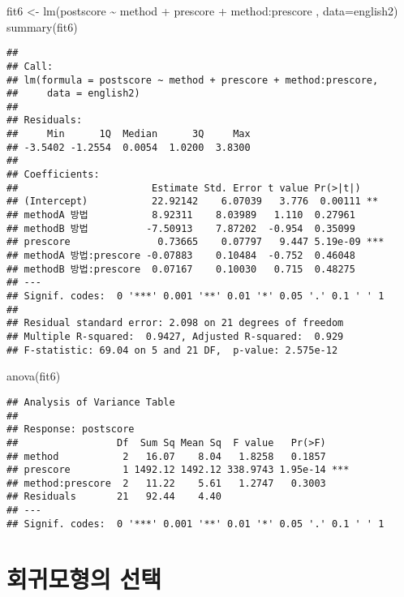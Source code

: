 \documentclass[
]{book}
\newenvironment{Shaded}{\begin{snugshade}}{\end{snugshade}}
\newcommand{\AttributeTok}[1]{\textcolor[rgb]{0.77,0.63,0.00}{#1}}
\newcommand{\FunctionTok}[1]{\textcolor[rgb]{0.00,0.00,0.00}{#1}}
\newcommand{\NormalTok}[1]{#1}
\newcommand{\OtherTok}[1]{\textcolor[rgb]{0.56,0.35,0.01}{#1}}
\newcommand{\SpecialCharTok}[1]{\textcolor[rgb]{0.00,0.00,0.00}{#1}}
\begin{document}
\begin{Shaded}
\begin{Highlighting}[]
\NormalTok{fit6 }\OtherTok{\textless{}{-}} \FunctionTok{lm}\NormalTok{(postscore }\SpecialCharTok{\textasciitilde{}}\NormalTok{ method }\SpecialCharTok{+}\NormalTok{ prescore }\SpecialCharTok{+}\NormalTok{ method}\SpecialCharTok{:}\NormalTok{prescore , }\AttributeTok{data=}\NormalTok{english2)}
\FunctionTok{summary}\NormalTok{(fit6)}
\end{Highlighting}
\end{Shaded}

\begin{verbatim}
## 
## Call:
## lm(formula = postscore ~ method + prescore + method:prescore, 
##     data = english2)
## 
## Residuals:
##     Min      1Q  Median      3Q     Max 
## -3.5402 -1.2554  0.0054  1.0200  3.8300 
## 
## Coefficients:
##                       Estimate Std. Error t value Pr(>|t|)    
## (Intercept)           22.92142    6.07039   3.776  0.00111 ** 
## methodA 방법           8.92311    8.03989   1.110  0.27961    
## methodB 방법          -7.50913    7.87202  -0.954  0.35099    
## prescore               0.73665    0.07797   9.447 5.19e-09 ***
## methodA 방법:prescore -0.07883    0.10484  -0.752  0.46048    
## methodB 방법:prescore  0.07167    0.10030   0.715  0.48275    
## ---
## Signif. codes:  0 '***' 0.001 '**' 0.01 '*' 0.05 '.' 0.1 ' ' 1
## 
## Residual standard error: 2.098 on 21 degrees of freedom
## Multiple R-squared:  0.9427, Adjusted R-squared:  0.929 
## F-statistic: 69.04 on 5 and 21 DF,  p-value: 2.575e-12
\end{verbatim}

\begin{Shaded}
\begin{Highlighting}[]
\FunctionTok{anova}\NormalTok{(fit6)}
\end{Highlighting}
\end{Shaded}

\begin{verbatim}
## Analysis of Variance Table
## 
## Response: postscore
##                 Df  Sum Sq Mean Sq  F value   Pr(>F)    
## method           2   16.07    8.04   1.8258   0.1857    
## prescore         1 1492.12 1492.12 338.9743 1.95e-14 ***
## method:prescore  2   11.22    5.61   1.2747   0.3003    
## Residuals       21   92.44    4.40                      
## ---
## Signif. codes:  0 '***' 0.001 '**' 0.01 '*' 0.05 '.' 0.1 ' ' 1
\end{verbatim}

\hypertarget{chapter06}{%
\chapter{회귀모형의 선택}\label{chapter06}}
\end{document}
